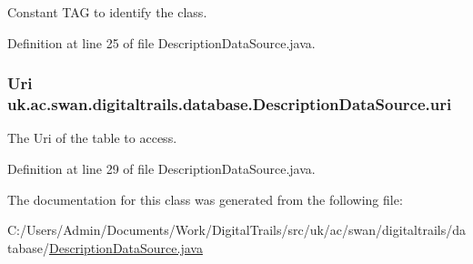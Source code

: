 Constant T\+A\+G to identify the class. 



Definition at line 25 of file Description\+Data\+Source.\+java.

\hypertarget{classuk_1_1ac_1_1swan_1_1digitaltrails_1_1database_1_1_description_data_source_ad5ab4f6ae6c94d72a77bd53a914aa8fa}{
\subsubsection[{uri}]{\setlength{\rightskip}{0pt plus 5cm}Uri uk.\+ac.\+swan.\+digitaltrails.\+database.\+Description\+Data\+Source.\+uri\hspace{0.3cm}{\ttfamily [protected]}}}\label{classuk_1_1ac_1_1swan_1_1digitaltrails_1_1database_1_1_description_data_source_ad5ab4f6ae6c94d72a77bd53a914aa8fa}


The Uri of the table to access. 



Definition at line 29 of file Description\+Data\+Source.\+java.



The documentation for this class was generated from the following file\+:\begin{DoxyCompactItemize}
\item 
C\+:/\+Users/\+Admin/\+Documents/\+Work/\+Digital\+Trails/src/uk/ac/swan/digitaltrails/database/\hyperlink{_description_data_source_8java}{Description\+Data\+Source.\+java}\end{DoxyCompactItemize}
